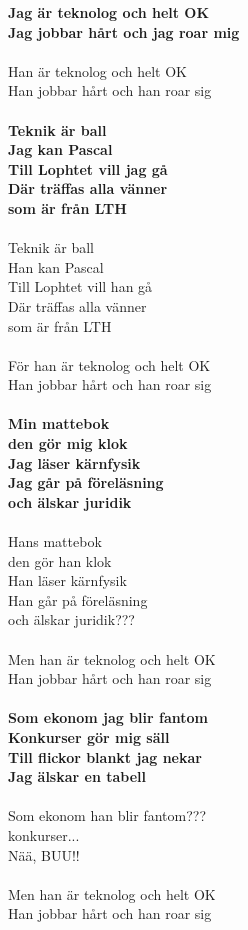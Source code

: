 \noindent\textbf{Jag är teknolog och helt OK\\
Jag jobbar hårt och jag roar mig}\\\\
\noindent Han är teknolog och helt OK\\
Han jobbar hårt och han roar sig\\\\
\noindent\textbf{Teknik är ball\\
Jag kan Pascal\\
Till Lophtet vill jag gå\\
Där träffas alla vänner\\
som är från LTH}\\\\
\noindent Teknik är ball\\
Han kan Pascal\\
Till Lophtet vill han gå\\
Där träffas alla vänner\\
som är från LTH\\\\
\noindent För han är teknolog och helt OK\\
Han jobbar hårt och han roar sig\\\\
\noindent\textbf{Min mattebok \\
den gör mig klok\\
Jag läser kärnfysik\\
Jag går på föreläsning\\
och älskar juridik}\\\\
\noindent Hans mattebok\\
den gör han klok\\
Han läser kärnfysik\\
Han går på föreläsning\\
och älskar juridik???\\\\
\noindent Men han är teknolog och helt OK\\
Han jobbar hårt och han roar sig\\\\
\noindent\textbf{Som ekonom jag blir fantom\\
Konkurser gör mig säll\\
Till flickor blankt jag nekar\\
Jag älskar en tabell}\\\\
\noindent Som ekonom han blir fantom???\\
konkurser...\\
Nää, BUU!!\\\\
\noindent Men han är teknolog och helt OK\\
Han jobbar hårt och han roar sig\\

